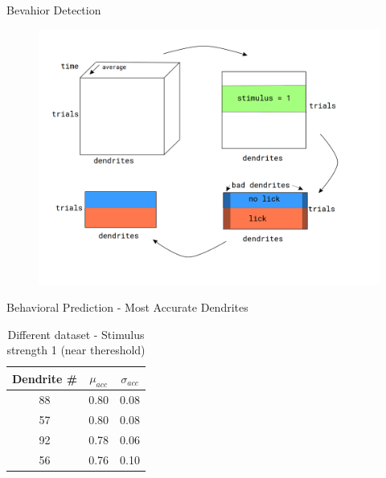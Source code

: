 \documentclass[10pt]{beamer}
\begin{document}
\begin{frame}[fragile]{Bevahior Detection}
\begin{center}
	\begin{figure}
      \includegraphics[width=1.0\textwidth]{data_hm.png}
	\end{figure}
	\end{center}
\end{frame}

\begin{frame}[fragile]{Behavioral Prediction - Most Accurate Dendrites}
\begin{table}
    \caption*{Different dataset - Stimulus strength 1 (near thereshold)}
    \begin{tabular}{c|c|c}
      \toprule
      Dendrite \# & $\mu_{acc}$ & $\sigma_{acc}$\\
      \midrule
      88 & 0.80 & 0.08\\
      57 & 0.80 & 0.08\\
      92 & 0.78 & 0.06\\
      56 & 0.76 & 0.10\\
      \bottomrule
    \end{tabular}
  \end{table}
\end{frame}
\end{document}
